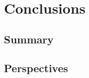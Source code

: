 \renewcommand{\thechapter}{\Alph{chapter}}
\setcounter{chapter}{3}  %
\chapter*{Conclusions}\label{chap:Conclusions}
\section{Summary}
\section{Perspectives}
